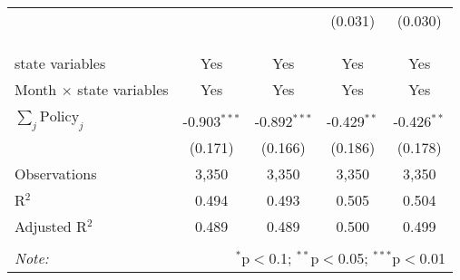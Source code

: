 \begin{tabular}{@{\extracolsep{1pt}}lcccc}
  &  &  & (0.031) & (0.030) \\ 
   &  &  &  &  \\ 
  &  &  &  &  \\ 
 \hline \\[-1.8ex] 
state variables & Yes & Yes & Yes & Yes \\ 
Month $\times$ state variables & Yes & Yes & Yes & Yes \\ 
\hline \\[-1.8ex] 
$\sum_j \mathrm{Policy}_j$ & -0.903$^{***}$ & -0.892$^{***}$ & -0.429$^{**}$ & -0.426$^{**}$ \\ 
 & (0.171) & (0.166) & (0.186) & (0.178) \\ 
Observations & 3,350 & 3,350 & 3,350 & 3,350 \\ 
R$^{2}$ & 0.494 & 0.493 & 0.505 & 0.504 \\ 
Adjusted R$^{2}$ & 0.489 & 0.489 & 0.500 & 0.499 \\ 
\hline 
\hline \\[-1.8ex] 
\textit{Note:}  & \multicolumn{4}{r}{$^{*}$p$<$0.1; $^{**}$p$<$0.05; $^{***}$p$<$0.01} \\ 
\end{tabular} 